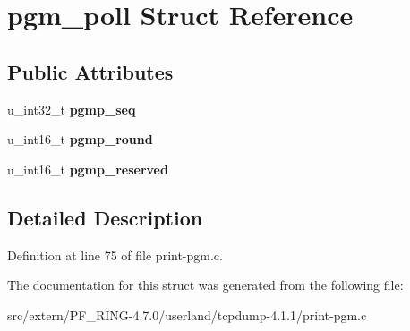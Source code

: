 \hypertarget{structpgm__poll}{
\section{pgm\_\-poll Struct Reference}
\label{structpgm__poll}
}
\subsection*{Public Attributes}
\begin{DoxyCompactItemize}
\item 
\hypertarget{structpgm__poll_ab36640478be9f1384713d29c1b036f49}{
u\_\-int32\_\-t {\bfseries pgmp\_\-seq}}
\label{structpgm__poll_ab36640478be9f1384713d29c1b036f49}

\item 
\hypertarget{structpgm__poll_a6a4db871dfad2325bd77842793db09cb}{
u\_\-int16\_\-t {\bfseries pgmp\_\-round}}
\label{structpgm__poll_a6a4db871dfad2325bd77842793db09cb}

\item 
\hypertarget{structpgm__poll_ae8e2a1b49e47210cd16f4d51d0856eb3}{
u\_\-int16\_\-t {\bfseries pgmp\_\-reserved}}
\label{structpgm__poll_ae8e2a1b49e47210cd16f4d51d0856eb3}

\end{DoxyCompactItemize}


\subsection{Detailed Description}


Definition at line 75 of file print-\/pgm.c.



The documentation for this struct was generated from the following file:\begin{DoxyCompactItemize}
\item 
src/extern/PF\_\-RING-\/4.7.0/userland/tcpdump-\/4.1.1/print-\/pgm.c\end{DoxyCompactItemize}
